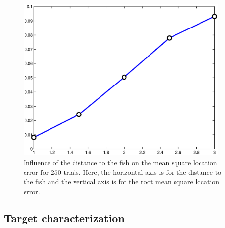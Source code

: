 \begin{figure}


\centering\includegraphics[width=10.5cm]{model/distance.eps}\caption{\label{fig:distance-noise}Influence
of the distance to the fish on the mean square location error for
$250$ trials. Here, the horizontal axis is for the distance to the
fish and the vertical axis is for the root mean square location
error.}


\end{figure}









\subsection{Target characterization} \label{subsectcharcat}


